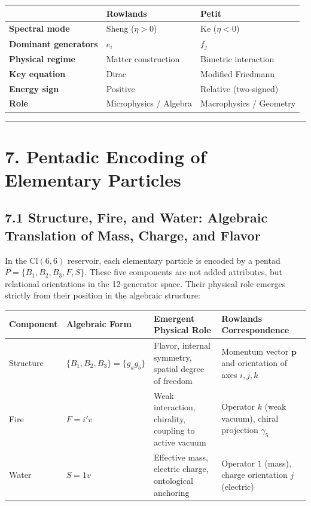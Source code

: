 \documentclass[11pt]{article}
\begin{document}
\begin{longtable}[]{@{}lll@{}}
\toprule
& Rowlands & Petit \\
\midrule
\endhead
\textbf{Spectral mode} & Sheng (\(\eta > 0\)) & Ke (\(\eta < 0\)) \\
\textbf{Dominant generators} & \(e_i\) & \(f_j\) \\
\textbf{Physical regime} & Matter construction & Bimetric interaction \\
\textbf{Key equation} & Dirac & Modified Friedmann \\
\textbf{Energy sign} & Positive & Relative (two‑signed) \\
\textbf{Role} & Microphysics / Algebra & Macrophysics / Geometry \\
\bottomrule
\end{longtable}

\begin{center}\rule{0.5\linewidth}{0.5pt}\end{center}

\hypertarget{pentadic-encoding-of-elementary-particles}{%
\section{7. Pentadic Encoding of Elementary
Particles}\label{pentadic-encoding-of-elementary-particles}}

\hypertarget{structure-fire-and-water-algebraic-translation-of-mass-charge-and-flavor}{%
\subsection{7.1 Structure, Fire, and Water: Algebraic Translation of
Mass, Charge, and
Flavor}\label{structure-fire-and-water-algebraic-translation-of-mass-charge-and-flavor}}

In the \(\text{Cl}(6,6)\) reservoir, each elementary particle is encoded
by a pentad \(P = \{B_1, B_2, B_3, F, S\}\). These five components are
not added attributes, but relational orientations in the 12-generator
space. Their physical role emerges strictly from their position in the
algebraic structure:

\begin{table}[H]
\centering
\small
\begin{tabularx}{\textwidth}{@{}lXXX@{}}
\toprule
Component & Algebraic Form & Emergent Physical Role & Rowlands Correspondence \\
\midrule
Structure & $\{B_1, B_2, B_3\} = \{g_a g_b\}$ & Flavor, internal symmetry, spatial degree of freedom & Momentum vector $\mathbf{p}$ and orientation of axes $i,j,k$ \\
Fire & $F = i'v$ & Weak interaction, chirality, coupling to active vacuum & Operator $k$ (weak vacuum), chiral projection $\gamma_5$ \\
Water & $S = 1v$ & Effective mass, electric charge, ontological anchoring & Operator $1$ (mass), charge orientation $j$ (electric) \\
\bottomrule
\end{tabularx}
\end{table}
\end{document}
